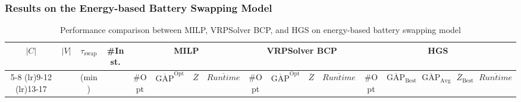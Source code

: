 \documentclass[3p, authoryear, 11pt]{elsarticle}
\begin{document}
\subsubsection{Results on the Energy-based Battery Swapping Model}
\label{sec:performance_energy_based}


\begin{table}[H]
    \centering
    \setlength{\tabcolsep}{3pt} 
    \renewcommand{\arraystretch}{0.95} 
    \caption{Performance comparison between MILP, VRPSolver BCP, and HGS on energy-based battery swapping model}
    \label{tab:performance_milp_cp_hgs_energy_based}
    \scriptsize
    \begin{tabular}{cccc cccc cccc ccccc}
    \toprule
    \multirow{2}{*}{$|C|$} & 
    \multirow{2}{*}{$|V|$} & 
    \multirow{2}{*}{$\tau_{\mathrm{swap}}$} & 
    \multirow{2}{*}{\#Inst.} &
    \multicolumn{4}{c}{MILP} & 
    \multicolumn{4}{c}{VRPSolver BCP} & 
    \multicolumn{5}{c}{HGS} \\
    \cmidrule(lr){5-8} \cmidrule(lr){9-12} \cmidrule(lr){13-17}
    & & (min) & 
    & \#Opt 
    & $\overline{\mathrm{GAP}}^{\mathrm{Opt}}$ 
    & $\overline{Z}$ 
    & $\overline{Runtime}$ 
    & \#Opt 
    & $\overline{\mathrm{GAP}}^{\mathrm{Opt}}$ 
    & $\overline{Z}$ 
    & $\overline{Runtime}$ 
    & \#Opt 
    & $\overline{\mathrm{GAP}}_{\text{Best}}$ 
    & $\overline{\mathrm{GAP}}_{\text{Avg}}$ 
    & $\overline{Z}_{\text{Best}}$ 
    & $\overline{Runtime}$ \\
    \midrule
    



\end{tabular}
\end{table}
\end{document}
